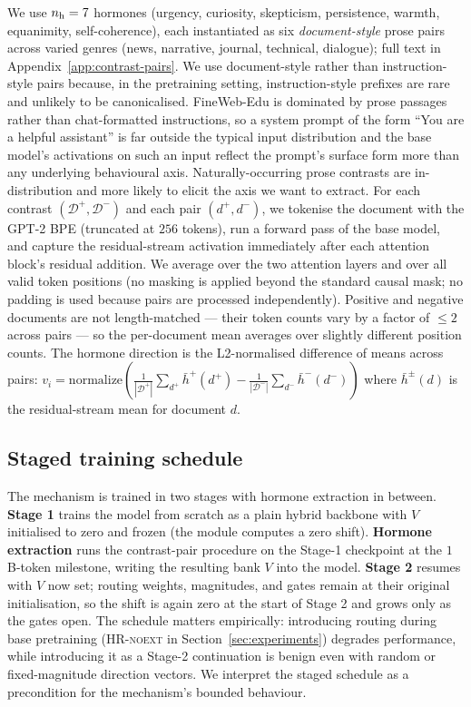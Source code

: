 We use $n_{\text{h}} = 7$ hormones (urgency, curiosity, skepticism, persistence, warmth, equanimity, self-coherence), each instantiated as six \emph{document-style} prose pairs across varied genres (news, narrative, journal, technical, dialogue); full text in Appendix~\ref{app:contrast-pairs}. We use document-style rather than instruction-style pairs because, in the pretraining setting, instruction-style prefixes are rare and unlikely to be canonicalised. FineWeb-Edu is dominated by prose passages rather than chat-formatted instructions, so a system prompt of the form ``You are a helpful assistant'' is far outside the typical input distribution and the base model's activations on such an input reflect the prompt's surface form more than any underlying behavioural axis. Naturally-occurring prose contrasts are in-distribution and more likely to elicit the axis we want to extract. For each contrast $(\mathcal{D}^+, \mathcal{D}^-)$ and each pair $(d^+, d^-)$, we tokenise the document with the GPT-2 BPE (truncated at $256$ tokens), run a forward pass of the base model, and capture the residual-stream activation immediately after each attention block's residual addition. We average over the two attention layers and over all valid token positions (no masking is applied beyond the standard causal mask; no padding is used because pairs are processed independently). Positive and negative documents are not length-matched --- their token counts vary by a factor of $\leq 2$ across pairs --- so the per-document mean averages over slightly different position counts. The hormone direction is the L2-normalised difference of means across pairs: $v_i = \mathrm{normalize}\!\left( \tfrac{1}{|\mathcal{D}^+|} \sum_{d^+} \bar h^+(d^+) - \tfrac{1}{|\mathcal{D}^-|} \sum_{d^-} \bar h^-(d^-) \right)$ where $\bar h^\pm(d)$ is the residual-stream mean for document $d$.

\subsection{Staged training schedule}

The mechanism is trained in two stages with hormone extraction in between. \textbf{Stage 1} trains the model from scratch as a plain hybrid backbone with $V$ initialised to zero and frozen (the module computes a zero shift). \textbf{Hormone extraction} runs the contrast-pair procedure on the Stage-1 checkpoint at the $1$B-token milestone, writing the resulting bank $V$ into the model. \textbf{Stage 2} resumes with $V$ now set; routing weights, magnitudes, and gates remain at their original initialisation, so the shift is again zero at the start of Stage 2 and grows only as the gates open. The schedule matters empirically: introducing routing during base pretraining (\textsc{HR-noext} in Section~\ref{sec:experiments}) degrades performance, while introducing it as a Stage-2 continuation is benign even with random or fixed-magnitude direction vectors. We interpret the staged schedule as a precondition for the mechanism's bounded behaviour.
